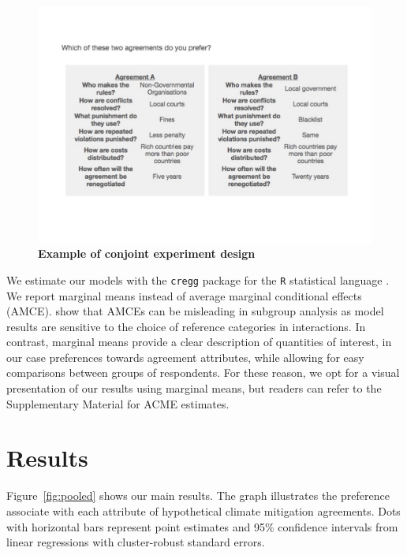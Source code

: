 \documentclass[a4paper,12pt]{article}
\begin{document}
\begin{figure}[H]
	\centering
	\includegraphics[width=13cm]{conjoint-cropped.pdf}
	\caption{\textbf{Example of conjoint experiment design}}
	\label{fig:conjoint}
\end{figure}

We estimate our models with the \texttt{cregg} package \citep{leeper2018cregg} for the \texttt{R} statistical language \citep{rstats2019}. We report marginal means instead of average marginal conditional effects (AMCE). \citet{leeper2018subgroup} show that AMCEs can be misleading in subgroup analysis as model results are sensitive to the choice of reference categories in interactions. In contrast, marginal means provide a clear description of quantities of interest, in our case preferences towards agreement attributes, while allowing for easy comparisons between groups of respondents. For these reason, we opt for a visual presentation of our results using marginal means, but readers can refer to the Supplementary Material for ACME estimates.  

\section{Results}%
\label{sec:results}

Figure~\ref{fig:pooled} shows our main results. The graph illustrates the preference associate with each attribute of hypothetical climate mitigation agreements. Dots with horizontal bars represent point estimates and 95\% confidence intervals from linear regressions with cluster-robust standard errors. \\ 
\end{document}
